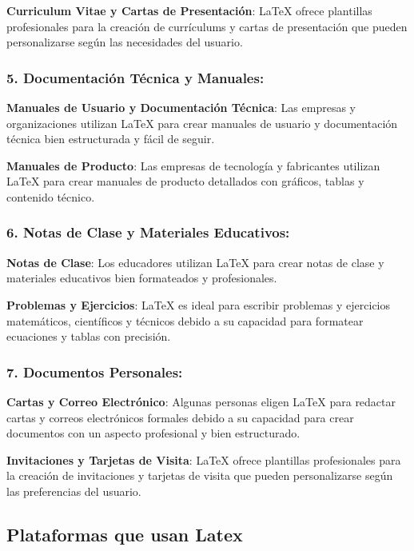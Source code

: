 \documentclass{article}
\begin{document}
\textbf{Curriculum Vitae y Cartas de Presentación}: LaTeX ofrece plantillas profesionales para la creación de currículums y cartas de presentación que pueden personalizarse según las necesidades del usuario.



 \subsubsection{5. Documentación Técnica y Manuales:}
 
\textbf{Manuales de Usuario y Documentación Técnica}: Las empresas y organizaciones utilizan LaTeX para crear manuales de usuario y documentación técnica bien estructurada y fácil de seguir.

\textbf{Manuales de Producto}: Las empresas de tecnología y fabricantes utilizan LaTeX para crear manuales de producto detallados con gráficos, tablas y contenido técnico.



\subsubsection{6. Notas de Clase y Materiales Educativos:} 
 
\textbf{Notas de Clase}: Los educadores utilizan LaTeX para crear notas de clase y materiales educativos bien formateados y profesionales.

\textbf{Problemas y Ejercicios}: LaTeX es ideal para escribir problemas y ejercicios matemáticos, científicos y técnicos debido a su capacidad para formatear ecuaciones y tablas con precisión.



 \subsubsection{7. Documentos Personales:}
 
\textbf{Cartas y Correo Electrónico}: Algunas personas eligen LaTeX para redactar cartas y correos electrónicos formales debido a su capacidad para crear documentos con un aspecto profesional y bien estructurado.

\textbf{Invitaciones y Tarjetas de Visita}: LaTeX ofrece plantillas profesionales para la creación de invitaciones y tarjetas de visita que pueden personalizarse según las preferencias del usuario.

\subsection{Plataformas que usan Latex}
\end{document}
